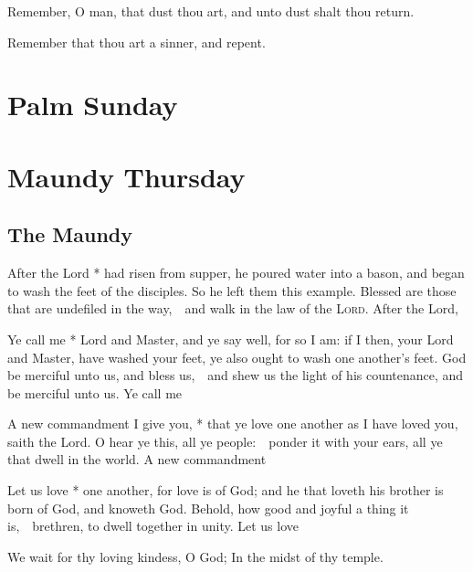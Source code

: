 \medskip

\centerline{}

Remember, O man, that dust thou art, and unto dust shalt thou return.

\centerline{}

Remember that thou art a sinner, and repent.

\fleuron

\section{Palm Sunday}
\section{Maundy Thursday}

\subsection{The Maundy}
\ant After the Lord * had risen from supper, he poured water into a bason, and began to wash the feet of the disciples. So he left them this example.  Blessed are those that are undefiled in the way,\ \star\ and walk in the law of the {\scshape Lord}.  After the Lord, \etc

\ant Ye call me * Lord and Master, and ye say well, for so I am: if I then, your Lord and Master, have washed your feet, ye also ought to wash one another’s feet.  God be merciful unto us, and bless us,\ \star\ and shew us the light of his countenance, and be merciful unto us.  Ye call me \etc

\ant A new commandment I give you, * that ye love one another as I have loved you, saith the Lord.  O hear ye this, all ye people:\ \star\ ponder it with your ears, all ye that dwell in the world.  A new commandment \etc

\ant Let us love * one another, for love is of God; and he that loveth his brother is born of God, and knoweth God.  Behold, how good and joyful a thing it is,\ \star\ brethren, to dwell together in unity.  Let us love \etc

\medskip
\V We wait for thy loving kindess, O God; \R In the midst of thy temple.

